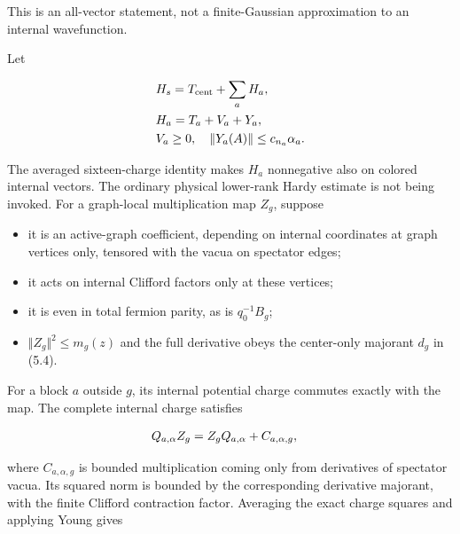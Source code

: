 This is an all-vector statement, not a finite-Gaussian approximation to
an internal wavefunction.

Let

\begin{gather*}
\begin{aligned}
& H_{s} = T_{\mathrm{cent}} + \sum _{a} H_{a}, \\
& H_{a} = T_{a} + V_{a} + Y_{a}, \\
& V_{a} \ge  0, \quad  \Vert Y_{a}(A)\Vert  \le  c_{n_{a}} \alpha _{a}.
\end{aligned}\notag
\end{gather*}

The averaged sixteen-charge identity makes \(H_{a}\) nonnegative also on
colored internal vectors. The ordinary physical lower-rank Hardy
estimate is not being invoked. For a graph-local multiplication map
\(Z_{g}\), suppose

\begin{itemize}
\tightlist
\item
  it is an active-graph coefficient, depending on internal coordinates
  at graph vertices only, tensored with the vacua on spectator edges;
\item
  it acts on internal Clifford factors only at these vertices;
\item
  it is even in total fermion parity, as is \(q_{0}^{-1} B_{g}\);
\item
  \(\Vert Z_{g}\Vert ^{2} \le  m_{g}(z)\) and the full derivative obeys
  the center-only majorant \(d_{g}\) in (5.4).
\end{itemize}

For a block \(a\) outside \(g\), its internal potential charge commutes
exactly with the map. The complete internal charge satisfies

\begin{gather*}
\begin{aligned}
& Q_{a,\alpha} Z_{g} = Z_{g} Q_{a,\alpha}+C_{a,\alpha ,g},
\end{aligned}\notag
\end{gather*}

where \(C_{a,\alpha ,g}\) is bounded multiplication coming only from
derivatives of spectator vacua. Its squared norm is bounded by the
corresponding derivative majorant, with the finite Clifford contraction
factor. Averaging the exact charge squares and applying Young gives

